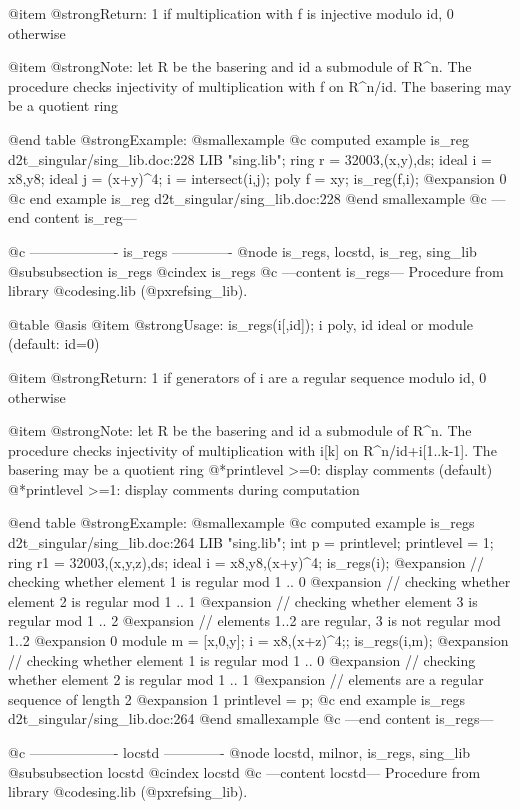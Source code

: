 @item @strong{Return:}
1 if multiplication with f is injective modulo id, 0 otherwise

@item @strong{Note:}
let R be the basering and id a submodule of R^n. The procedure checks
injectivity of multiplication with f on R^n/id. The basering may be a
quotient ring

@end table
@strong{Example:}
@smallexample
@c computed example is_reg d2t_singular/sing_lib.doc:228 
LIB "sing.lib";
ring r  = 32003,(x,y),ds;
ideal i = x8,y8;
ideal j = (x+y)^4;
i       = intersect(i,j);
poly f  = xy;
is_reg(f,i);
@expansion{} 0
@c end example is_reg d2t_singular/sing_lib.doc:228
@end smallexample
@c ---end content is_reg---

@c ------------------- is_regs -------------
@node is_regs, locstd, is_reg, sing_lib
@subsubsection is_regs
@cindex is_regs
@c ---content is_regs---
Procedure from library @code{sing.lib} (@pxref{sing_lib}).

@table @asis
@item @strong{Usage:}
is_regs(i[,id]); i poly, id ideal or module (default: id=0)

@item @strong{Return:}
1 if generators of i are a regular sequence modulo id, 0 otherwise

@item @strong{Note:}
let R be the basering and id a submodule of R^n. The procedure checks
injectivity of multiplication with i[k] on R^n/id+i[1..k-1].
The basering may be a quotient ring
@*printlevel >=0: display comments (default)
@*printlevel >=1: display comments during computation

@end table
@strong{Example:}
@smallexample
@c computed example is_regs d2t_singular/sing_lib.doc:264 
LIB "sing.lib";
int p      = printlevel;
printlevel = 1;
ring r1    = 32003,(x,y,z),ds;
ideal i    = x8,y8,(x+y)^4;
is_regs(i);
@expansion{} // checking whether element 1 is regular mod 1 .. 0
@expansion{} // checking whether element 2 is regular mod 1 .. 1
@expansion{} // checking whether element 3 is regular mod 1 .. 2
@expansion{} // elements 1..2 are regular, 3 is not regular mod 1..2
@expansion{} 0
module m   = [x,0,y];
i          = x8,(x+z)^4;;
is_regs(i,m);
@expansion{} // checking whether element 1 is regular mod 1 .. 0
@expansion{} // checking whether element 2 is regular mod 1 .. 1
@expansion{} // elements are a regular sequence of length 2
@expansion{} 1
printlevel = p;
@c end example is_regs d2t_singular/sing_lib.doc:264
@end smallexample
@c ---end content is_regs---

@c ------------------- locstd -------------
@node locstd, milnor, is_regs, sing_lib
@subsubsection locstd
@cindex locstd
@c ---content locstd---
Procedure from library @code{sing.lib} (@pxref{sing_lib}).

